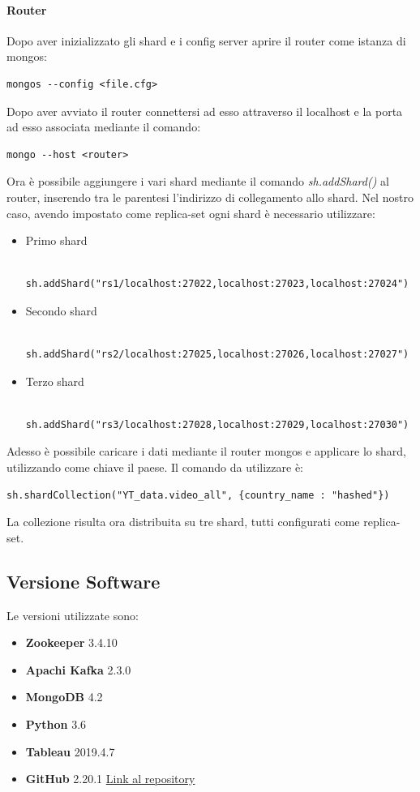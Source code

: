\documentclass[10pt, a4paper,openany]{article}
\begin{document}
\paragraph{Router\\}
Dopo aver inizializzato gli shard e i config server aprire il router come istanza di mongos:

\begin{Verbatim}
mongos --config <file.cfg>
\end{Verbatim}

Dopo aver avviato il router connettersi ad esso attraverso il localhost e la porta ad esso associata mediante il comando:

\begin{Verbatim}
mongo --host <router>
\end{Verbatim}

Ora è possibile aggiungere i vari shard mediante il comando \textit{sh.addShard()} al router, inserendo tra le parentesi l'indirizzo di collegamento allo shard. Nel nostro caso, avendo impostato come replica-set ogni shard è necessario utilizzare:
\begin{itemize}
	\item Primo shard
	\begin{Verbatim}
	sh.addShard("rs1/localhost:27022,localhost:27023,localhost:27024")
	\end{Verbatim}
	\item Secondo shard
	\begin{Verbatim}
	sh.addShard("rs2/localhost:27025,localhost:27026,localhost:27027")
	\end{Verbatim}
	\item Terzo shard
	\begin{Verbatim}
	sh.addShard("rs3/localhost:27028,localhost:27029,localhost:27030")
	\end{Verbatim}
\end{itemize}

Adesso è possibile caricare i dati mediante il router mongos e applicare lo shard, utilizzando come chiave il paese. Il comando da utilizzare è:

\begin{Verbatim}
sh.shardCollection("YT_data.video_all", {country_name : "hashed"})
\end{Verbatim}

La collezione risulta ora distribuita su tre shard, tutti configurati come replica-set.

\subsection*{Versione Software}
Le versioni utilizzate sono:
\begin{itemize}
	\item \textbf{Zookeeper} 3.4.10
	\item \textbf{Apachi Kafka} 2.3.0
	\item \textbf{MongoDB} 4.2
	\item \textbf{Python} 3.6
	\item \textbf{Tableau} 2019.4.7
	\item \textbf{GitHub} 2.20.1 \href{https://github.com/fedelux3/Youtube_trending_analysis}{Link al repository}
\end{itemize}
\end{document}
